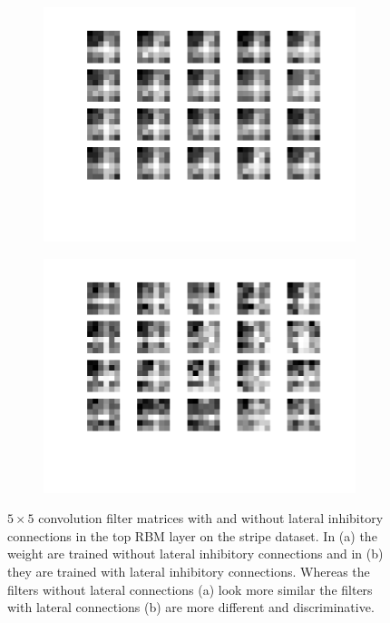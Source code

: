 \begin{figure}[h!]
	\centering
	\begin{subfigure}[t]{.45\textwidth}
  		\centering
  		\includegraphics[width=.9\linewidth]{imgs/inhib/02129.png}
  		\caption{}
  		\label{fig:sub1}
	\end{subfigure}%
	\begin{subfigure}[t]{.45\textwidth}
  		\centering
  		\includegraphics[width=.9\linewidth]{imgs/inhib/03023.png}
  		\caption{}
  		\label{fig:sub2}
	\end{subfigure}
	\caption[$5 \times 5$ convolution filter matrices with and without lateral inhibitory connections in the top RBM layer on the stripe dataset.]{$5 \times 5$ convolution filter matrices with and without lateral inhibitory connections in the top RBM layer on the stripe dataset. In (a) the weight are trained without lateral inhibitory connections and in (b) they are trained with lateral inhibitory connections. Whereas the filters without lateral connections (a) look more similar the filters with lateral connections (b) are more different and discriminative. }
	\label{fig:latconstr}
\end{figure}

